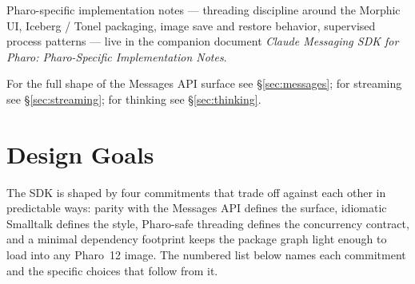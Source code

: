 \documentclass[a4paper,10pt,fleqn]{article}
\begin{document}
Pharo-specific implementation notes --- threading discipline around
the Morphic UI, Iceberg / Tonel packaging, image save and restore
behavior, supervised process patterns --- live in the companion
document \emph{Claude Messaging SDK for Pharo: Pharo-Specific
Implementation Notes}.

For the full shape of the Messages API surface see
\S\ref{sec:messages}; for streaming see \S\ref{sec:streaming}; for
thinking see \S\ref{sec:thinking}.

\medskip
{}

\section{Design Goals}
\label{sec:design-goals}

The SDK is shaped by four commitments that trade off against each
other in predictable ways: parity with the Messages API defines the
surface, idiomatic Smalltalk defines the style, Pharo-safe threading
defines the concurrency contract, and a minimal dependency footprint
keeps the package graph light enough to load into any Pharo~12 image.
The numbered list below names each commitment and the specific choices
that follow from it.
\end{document}
